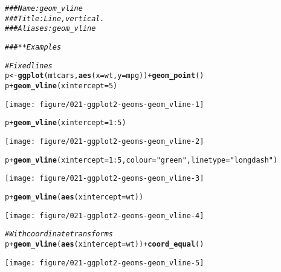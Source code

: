 \documentclass[a4paper,titlepage]{tufte-handout}\usepackage[]{graphicx}\usepackage[]{color}
\makeatletter
\def\maxwidth{ %
  \ifdim\Gin@nat@width>\linewidth
    \linewidth
  \else
    \Gin@nat@width
  \fi
}
\newcommand{\hlnum}[1]{\textcolor[rgb]{0.686,0.059,0.569}{#1}}%
\newcommand{\hlstr}[1]{\textcolor[rgb]{0.192,0.494,0.8}{#1}}%
\newcommand{\hlcom}[1]{\textcolor[rgb]{0.678,0.584,0.686}{\textit{#1}}}%
\newcommand{\hlopt}[1]{\textcolor[rgb]{0,0,0}{#1}}%
\newcommand{\hlstd}[1]{\textcolor[rgb]{0.345,0.345,0.345}{#1}}%
\newcommand{\hlkwb}[1]{\textcolor[rgb]{0.69,0.353,0.396}{#1}}%
\newcommand{\hlkwc}[1]{\textcolor[rgb]{0.333,0.667,0.333}{#1}}%
\newcommand{\hlkwd}[1]{\textcolor[rgb]{0.737,0.353,0.396}{\textbf{#1}}}%
\newenvironment{kframe}{%
 \def\at@end@of@kframe{}%
 \ifinner\ifhmode%
  \def\at@end@of@kframe{\end{minipage}}%
  \begin{minipage}{\columnwidth}%
 \fi\fi%
 \def\FrameCommand##1{\hskip\@totalleftmargin \hskip-\fboxsep
 \colorbox{shadecolor}{##1}\hskip-\fboxsep
     \hskip-\linewidth \hskip-\@totalleftmargin \hskip\columnwidth}%
 \MakeFramed {\advance\hsize-\width
   \@totalleftmargin\z@ \linewidth\hsize
   \@setminipage}}%
 {\par\unskip\endMakeFramed%
 \at@end@of@kframe}
\newenvironment{knitrout}{}{} %
\makeatother
\begin{document}
\begin{knitrout}
\color{fgcolor}\begin{kframe}
\begin{alltt}
\hlcom{### Name: geom_vline}
\hlcom{### Title: Line, vertical.}
\hlcom{### Aliases: geom_vline}

\hlcom{### ** Examples}

\hlcom{# Fixed lines}
\hlstd{p} \hlkwb{<-} \hlkwd{ggplot}\hlstd{(mtcars,} \hlkwd{aes}\hlstd{(}\hlkwc{x} \hlstd{= wt,} \hlkwc{y} \hlstd{= mpg))} \hlopt{+} \hlkwd{geom_point}\hlstd{()}
\hlstd{p} \hlopt{+} \hlkwd{geom_vline}\hlstd{(}\hlkwc{xintercept} \hlstd{=} \hlnum{5}\hlstd{)}
\end{alltt}
\end{kframe}
\texttt{[image: figure/021-ggplot2-geoms-geom\_vline-1]} 
\begin{kframe}\begin{alltt}
\hlstd{p} \hlopt{+} \hlkwd{geom_vline}\hlstd{(}\hlkwc{xintercept} \hlstd{=} \hlnum{1}\hlopt{:}\hlnum{5}\hlstd{)}
\end{alltt}
\end{kframe}
\texttt{[image: figure/021-ggplot2-geoms-geom\_vline-2]} 
\begin{kframe}\begin{alltt}
\hlstd{p} \hlopt{+} \hlkwd{geom_vline}\hlstd{(}\hlkwc{xintercept} \hlstd{=} \hlnum{1}\hlopt{:}\hlnum{5}\hlstd{,} \hlkwc{colour}\hlstd{=}\hlstr{"green"}\hlstd{,} \hlkwc{linetype} \hlstd{=} \hlstr{"longdash"}\hlstd{)}
\end{alltt}
\end{kframe}
\texttt{[image: figure/021-ggplot2-geoms-geom\_vline-3]} 
\begin{kframe}\begin{alltt}
\hlstd{p} \hlopt{+} \hlkwd{geom_vline}\hlstd{(}\hlkwd{aes}\hlstd{(}\hlkwc{xintercept} \hlstd{= wt))}
\end{alltt}
\end{kframe}
\texttt{[image: figure/021-ggplot2-geoms-geom\_vline-4]} 
\begin{kframe}\begin{alltt}
\hlcom{# With coordinate transforms}
\hlstd{p} \hlopt{+} \hlkwd{geom_vline}\hlstd{(}\hlkwd{aes}\hlstd{(}\hlkwc{xintercept} \hlstd{= wt))} \hlopt{+} \hlkwd{coord_equal}\hlstd{()}
\end{alltt}
\end{kframe}
\texttt{[image: figure/021-ggplot2-geoms-geom\_vline-5]} 

\end{knitrout}
\end{document}
